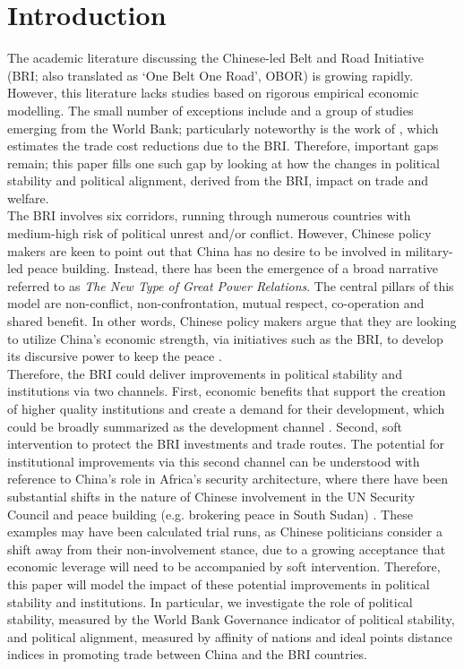 \section{Introduction}

The academic literature discussing the Chinese-led Belt and Road Initiative (BRI; also translated as ‘One Belt One Road’, OBOR) is growing rapidly. However, this literature lacks studies based on rigorous empirical economic modelling. The small number of exceptions include \cite{Herrero2017ChinasGains} and a group of studies emerging from the World Bank; particularly noteworthy is the work of \cite {de2018much}, which estimates the trade cost reductions due to the BRI. Therefore, important gaps remain; this paper fills one such gap by looking at how the changes in political stability and political alignment, derived from the BRI, impact on trade and welfare.        
\\
\indent The BRI involves six corridors, running through numerous countries with medium-high risk of political unrest and/or conflict. However, Chinese policy makers are keen to point out that China has no desire to be involved in military-led peace building. Instead, there has been the emergence of a broad narrative referred to as \textit{The New Type of Great Power Relations}. The central pillars of this model are non-conflict, non-confrontation, mutual respect, co-operation and shared benefit. In other words, Chinese policy makers argue that they are looking to utilize China's economic strength, via initiatives such as the BRI, to develop its discursive power to keep the peace \citep{zhao2016china}.  
 \\
 \indent Therefore, the BRI could deliver improvements in political stability and institutions via two channels. First, economic benefits that support the creation of higher quality institutions and create a demand for their development, which could be broadly summarized as the development channel \citep{rigobon2005rule}. Second, soft intervention to protect the BRI investments and trade routes. The potential for institutional improvements via this second channel can be understood with reference to China's role in Africa’s security architecture, where there have been substantial shifts in the nature of Chinese involvement in the UN Security Council and peace building (e.g. brokering peace in South Sudan) \citep{alden2017china}. These examples may have been calculated trial runs, as Chinese politicians consider a shift away from their non-involvement stance, due to a growing acceptance that economic leverage will need to be accompanied by soft intervention. Therefore, this paper will model the impact of these potential improvements in political stability and institutions. In particular, we investigate the role of political stability, measured by the World Bank Governance indicator of political stability, and political alignment, measured by affinity of nations and ideal points distance indices \citep{Bailey2017EstimatingData} in promoting trade between China and the BRI countries. 
